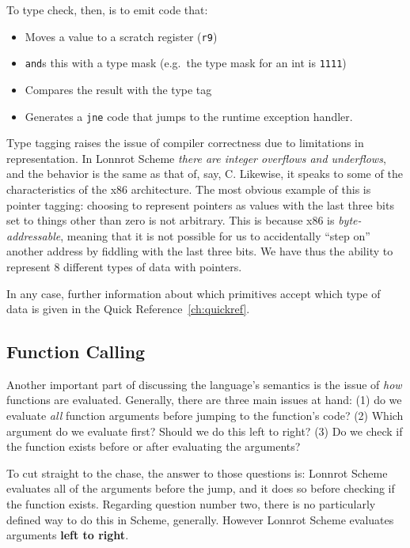 To type check, then, is to emit code that:
\begin{itemize}
  \item Moves a value to a scratch register (\texttt{r9})
  \item \texttt{and}s this with a type mask (e.g.\ the type mask for an int is \texttt{1111})
  \item Compares the result with the type tag
  \item Generates a \texttt{jne} code that jumps to the runtime exception handler.
\end{itemize}
\vspace{1cm}

Type tagging raises the issue of compiler correctness due to limitations in representation.
In Lonnrot Scheme \textit{there are integer overflows and underflows}, and the behavior is
the same as that of, say, C. Likewise, it speaks to some of the characteristics of the x86
architecture. The most obvious example of this is pointer tagging: choosing to represent
pointers as values with the last three bits set to things other than zero is not arbitrary.
This is because x86 is \textit{byte-addressable}, meaning that it is not possible for us to
accidentally ``step on'' another address by fiddling with the last three bits. We have thus
the ability to represent 8 different types of data with pointers.

In any case, further information about which primitives accept which type of data is given
in the Quick Reference~\ref{ch:quickref}.

\subsection{Function Calling}
Another important part of discussing the language's semantics is the issue of \textit{how} functions
are evaluated. Generally, there are three main issues at hand: (1) do we evaluate \textit{all} function
arguments before jumping to the function's code? (2) Which argument do we evaluate first? Should we
do this left to right? (3) Do we check if the function exists before or after evaluating the arguments?

To cut straight to the chase, the answer to those questions is: Lonnrot Scheme evaluates all of the
arguments before the jump, and it does so before checking if the function exists.
Regarding question number two, there is no particularly defined way to do this in Scheme, generally. However
Lonnrot Scheme evaluates arguments \textbf{left to right}.

